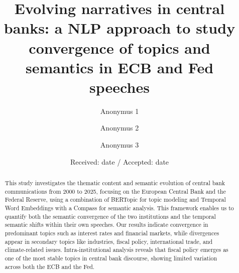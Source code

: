 \title{Evolving narratives in central banks: a NLP approach to study convergence of topics and semantics in ECB and Fed speeches}




\author{
Anonymus 1   \and 
Anonymus 2  \and 
Anonymus 3 
}




\date{Received: date / Accepted: date}


\maketitle

\begin{abstract}
This study investigates the thematic content and semantic evolution of central bank communications from 2000 to 2025, focusing on the European Central Bank and the Federal Reserve, using a combination of BERTopic for topic modeling and Temporal Word Embeddings with a Compass for semantic analysis. This framework enables us to quantify both the semantic convergence of the two institutions and the temporal semantic shifts within their own speeches. Our results indicate convergence in predominant topics such as interest rates and financial markets, while divergences appear in secondary topics like industries, fiscal policy, international trade, and climate-related issues. Intra-institutional analysis reveals that fiscal policy emerges as one of the most stable topics in central bank discourse, showing limited variation across both the ECB and the Fed. 

\end{abstract}


